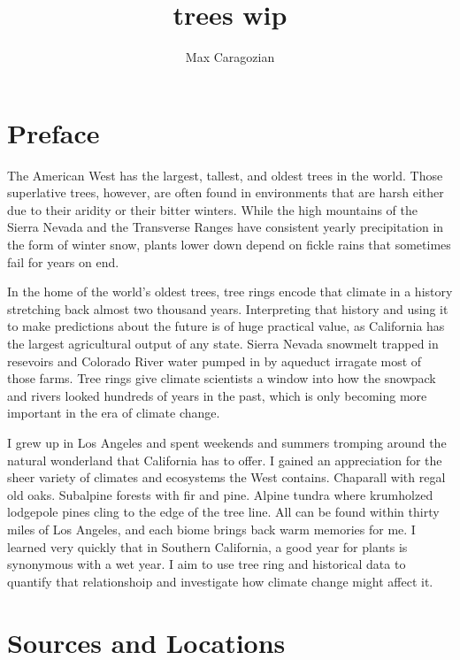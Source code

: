 \documentclass[]{article}
\title{trees wip}
\author{Max Caragozian}
\begin{document}
\maketitle

\section{Preface}
The  American West has the largest, tallest, and oldest trees in the world. Those superlative trees, however, are often found in environments that are harsh either due to their aridity or their bitter winters. While the high mountains of the Sierra Nevada and the Transverse Ranges have consistent yearly precipitation in the form of winter snow, plants lower down depend on fickle rains that sometimes fail for years on end.

In the home of the world's oldest trees, tree rings encode that climate in a history stretching back almost two thousand years. Interpreting that history and using it to make predictions about the future is of huge practical value, as California has the largest agricultural output of any state. Sierra Nevada snowmelt trapped in resevoirs and Colorado River water pumped in by aqueduct irragate most of those farms. Tree rings give climate scientists a window into how the snowpack and rivers looked hundreds of years in the past, which is only becoming more important in the era of climate change.

I grew up in Los Angeles and spent weekends and summers tromping around the natural wonderland that California has to offer. I gained an appreciation for the sheer variety of climates and ecosystems the West contains. Chaparall with regal old oaks. Subalpine forests with fir and pine. Alpine tundra where krumholzed lodgepole pines cling to the edge of the tree line. All can be found within thirty miles of Los Angeles, and each biome brings back warm memories for me. I learned very quickly that in Southern California, a good year for plants is synonymous with a wet year. I aim to use tree ring and historical data to quantify that relationshoip and investigate how climate change might affect it. 

\section{Sources and Locations}
\end{document}
